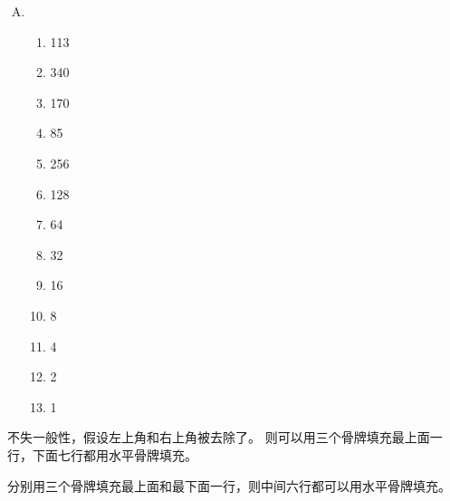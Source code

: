 {{\begin{practices}
\begin{enumerate}[A.]
{\begin{enumerate}[1.]
                        \item 40
                        \item 20
                        \item 10
                        \item 5
                        \item 16
                        \item 8
                        \item 4
                        \item 2
                        \item 1
                    \end{enumerate}
                }
                \item
                {
                    \begin{enumerate}[1.]
                        \item 113
                        \item 340
                        \item 170
                        \item 85
                        \item 256
                        \item 128
                        \item 64
                        \item 32
                        \item 16
                        \item 8
                        \item 4
                        \item 2
                        \item 1
                    \end{enumerate}
                }
            \end{enumerate}
        \end{practices}

        \begin{practices}
            不失一般性，假设左上角和右上角被去除了。
            则可以用三个骨牌填充最上面一行，下面七行都用水平骨牌填充。
        \end{practices}

        \begin{practices}
            分别用三个骨牌填充最上面和最下面一行，则中间六行都可以用水平骨牌填充。
        \end{practices}

}}
